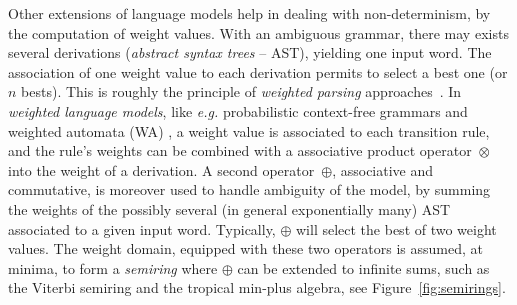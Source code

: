 \documentclass[runningheads]{llncs}
\def\ie{\textit{i.e.}\xspace}
\def\eg{\textit{e.g.}\xspace}
\newcommand{\Semiring}{\mathbb{S}}
\def\WA{\textsf{WA}\xspace}
\begin{document}
Other extensions of language models  %
help in dealing with non-determinism, by the computation of weight values. 
With an ambiguous grammar, there may exists several derivations 
(\emph{abstract syntax trees} -- AST), %
yielding one input word. %
The association of one weight value %
to each derivation permits to select a best one (or $n$ bests). %
This is roughly the principle of \emph{weighted parsing}
approaches~\cite{Goodman99SemiringParsing,Nederhof03weightedParsing,MorbitzVogler19weighted-parsing}.
In \emph{weighted language models}, 
like \eg probabilistic context-free grammars %
and weighted automata (\WA) \cite{Droste09handbook},
a weight value is associated to each transition rule, %
and the rule's weights can be combined with a associative product operator~$\otimes$ into 
the weight of a derivation.
A second operator~$\oplus$, associative and commutative, 
is moreover used to handle ambiguity of the model, 
by summing the weights of the possibly several (in general exponentially many) AST %
associated to a given input word.
Typically, $\oplus$ will select the best of two weight values.
The weight domain, equipped with these two operators is assumed, at minima, 
to form a \emph{semiring} %
where $\oplus$ can be extended to infinite sums, 
such as the Viterbi semiring and the tropical min-plus algebra, see Figure~\ref{fig:semirings}. 
\end{document}
